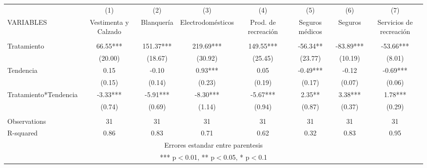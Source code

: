 \documentclass[]{article}
\begin{document}
\begin{tabular}{lccccccc} \hline
 & (1) & (2) & (3) & (4) & (5) & (6) & (7) \\
VARIABLES & Vestimenta y Calzado & Blanquería & Electrodomésticos & Prod. de recreación & Seguros médicos & Seguros & Servicios de recreación \\ \hline
 &  &  &  &  &  &  &  \\
Tratamiento & 66.55*** & 151.37*** & 219.69*** & 149.55*** & -56.34** & -83.89*** & -53.66*** \\
 & (20.00) & (18.67) & (30.92) & (25.45) & (23.77) & (10.19) & (8.01) \\
Tendencia & 0.15 & -0.10 & 0.93*** & 0.05 & -0.49*** & -0.12 & -0.69*** \\
 & (0.15) & (0.14) & (0.23) & (0.19) & (0.17) & (0.07) & (0.06) \\
Tratamiento*Tendencia & -3.33*** & -5.91*** & -8.30*** & -5.67*** & 2.35** & 3.38*** & 1.78*** \\
 & (0.74) & (0.69) & (1.14) & (0.94) & (0.87) & (0.37) & (0.29) \\
 &  &  &  &  &  &  &  \\
Observations & 31 & 31 & 31 & 31 & 31 & 31 & 31 \\
 R-squared & 0.86 & 0.83 & 0.71 & 0.62 & 0.32 & 0.83 & 0.95 \\ \hline
\multicolumn{8}{c}{ Errores estandar entre parentesis} \\
\multicolumn{8}{c}{ *** p$<$0.01, ** p$<$0.05, * p$<$0.1} \\
\end{tabular}
\end{document}
